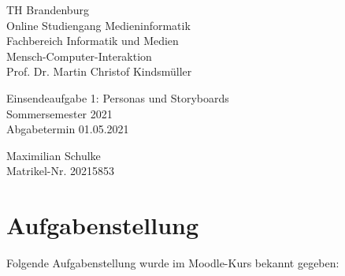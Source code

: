 \documentclass{article}
\begin{document}
\begin{titlepage}
	\begin{flushleft}
		TH Brandenburg \\
		Online Studiengang Medieninformatik \\
		Fachbereich Informatik und Medien \\
		Mensch-Computer-Interaktion \\
		Prof. Dr. Martin Christof Kindsmüller
	\end{flushleft}

	\vfill

	\begin{center}
		\Large{Einsendeaufgabe 1: Personas und Storyboards}\\[0.5em]
		\large{Sommersemester 2021}\\[0.25em]
		\large{Abgabetermin 01.05.2021}
	\end{center}

	\vfill

	\begin{flushright}
		Maximilian Schulke \\
		Matrikel-Nr. 20215853
	\end{flushright}
\end{titlepage}

\tableofcontents

\vfill

\section{Aufgabenstellung}

Folgende Aufgabenstellung wurde im Moodle-Kurs bekannt gegeben:
\end{document}
